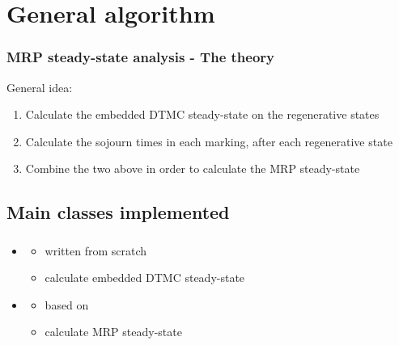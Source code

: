 \section{General algorithm}
\begin{frame}
  \frametitle{\acs{MRP} steady-state analysis - The theory}
  General idea:
  \begin{enumerate}
  \item<2-> Calculate the embedded \acs{DTMC} steady-state on the
    regenerative states
  \item<3-> Calculate the sojourn times in each marking, after each
    regenerative state
  \item<4-> Combine the two above in order to calculate the \acs{MRP} steady-state
  \end{enumerate}
  \begin{center}
  \end{center}
\end{frame}

\subsection{Main classes implemented}
\begin{frame}
  \frametitle{\insertsubsection}
  \begin{itemize}
	  \item {}
	  \begin{itemize}
	  	\item written from scratch
	  	\item calculate embedded \acs{DTMC} steady-state
	  \end{itemize}
	  \item {}
	  \begin{itemize}
	  	\item based on 
	  	\item calculate \acs{MRP} steady-state
	  \end{itemize}
  \end{itemize}
\end{frame}

